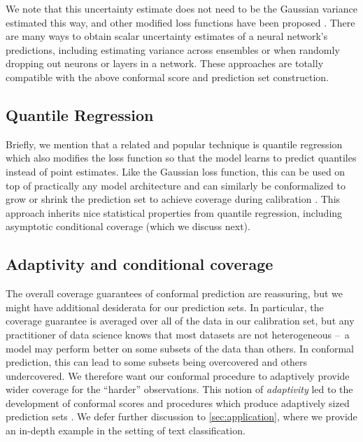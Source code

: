 \documentclass[a4paper, 12pt]{article}
\begin{document}
We note that this uncertainty estimate does not need to be the Gaussian variance estimated this way, and other modified loss functions have been proposed \autocite{tohmeReliableNeuralNetworks2023}. There are many ways to obtain scalar uncertainty estimates of a neural network's predictions, including estimating variance across ensembles or when randomly dropping out neurons or layers in a network. These approaches are totally compatible with the above conformal score and prediction set construction.

\subsection{Quantile Regression}
\label{sec:quantile}
Briefly, we mention that a related and popular technique is quantile regression \autocite{koenkerRegressionQuantiles1978} which also modifies the loss function so that the model learns to predict quantiles instead of point estimates. Like the Gaussian loss function, this can be used on top of practically any model architecture and can similarly be conformalized to grow or shrink the prediction set to achieve coverage during calibration \autocite{romanoConformalizedQuantileRegression2019}. This approach inherits nice statistical properties from quantile regression, including asymptotic conditional coverage (which we discuss next).

\subsection{Adaptivity and conditional coverage}
\label{sec:adaptivity}
The overall coverage guarantees of conformal prediction are reassuring, but we might have additional desiderata for our prediction sets. In particular, the coverage guarantee is averaged over all of the data in our calibration set, but any practitioner of data science knows that most datasets are not heterogeneous --\ a model may perform better on some subsets of the data than others. In conformal prediction, this can lead to some subsets being overcovered and others undercovered. We therefore want our conformal procedure to adaptively provide wider coverage for the ``harder'' observations. This notion of \textit{adaptivity} led to the development of conformal scores and procedures which produce adaptively sized prediction sets \autocite{angelopoulosUncertaintySetsImage2022,romanoClassificationValidAdaptive2020}. We defer further discussion to \ref*{sec:application}, where we provide an in-depth example in the setting of text classification.
\end{document}
